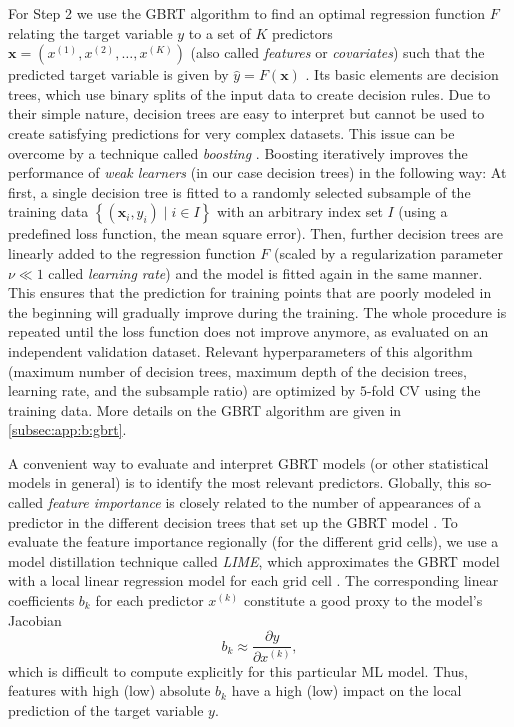 For Step 2 we use the \ac{GBRT} algorithm to find an optimal regression
function $F$ relating the target variable $y$ to a set of $K$ predictors
$\bm{x} = \left( x^{(1)}, x^{(2)}, \ldots, x^{(K)} \right)$ (also called
\emph{features} or \emph{covariates}) such that the predicted target variable
is given by $\hat{y} = F(\bm{x})$ \autocite{Death2007, Elith2008, Friedman2001,
  Friedman2002}. Its basic elements are decision trees, which use binary splits
of the input data to create decision rules. Due to their simple nature,
decision trees are easy to interpret but cannot be used to create satisfying
predictions for very complex datasets. This issue can be overcome by a
technique called \emph{boosting} \autocite{Freund1996}. Boosting iteratively
improves the performance of \emph{weak learners} (in our case decision trees)
in the following way: At first, a single decision tree is fitted to a randomly
selected subsample of the training data $\left\{ \left( \bm{x}_i, y_i \right)
\mid i \in I \right\}$ with an arbitrary index set $I$ (using a predefined loss
function, \eg{} the mean square error). Then, further decision trees are
linearly added to the regression function $F$ (scaled by a regularization
parameter $\nu \ll 1$ called \emph{learning rate}) and the model is fitted
again in the same manner. This ensures that the prediction for training points
that are poorly modeled in the beginning will gradually improve during the
training. The whole procedure is repeated until the loss function does not
improve anymore, as evaluated on an independent validation dataset. Relevant
hyperparameters of this algorithm (maximum number of decision trees, maximum
depth of the decision trees, learning rate, and the subsample ratio) are
optimized by $5$-fold \acf{CV} using the training data. More details on the
\ac{GBRT} algorithm are given in \cref{subsec:app:b:gbrt}.

A convenient way to evaluate and interpret \ac{GBRT} models (or other
statistical models in general) is to identify the most relevant predictors.
Globally, this so-called \emph{feature importance} is closely related to the
number of appearances of a predictor in the different decision trees that set
up the \ac{GBRT} model \autocite{Friedman2001}. To evaluate the feature
importance regionally (for the different grid cells), we use a model
distillation technique called \emph{\ac{LIME}}, which approximates the
\ac{GBRT} model with a local linear regression model for each grid cell
\autocite{Ribeiro2016}. The corresponding linear coefficients $b_k$ for each
predictor $x^{(k)}$ constitute a good proxy to the model's Jacobian
\begin{equation}
  b_k \approx \frac{\partial y}{\partial x^{(k)}},
  \label{eq:06:jacobian}
\end{equation}
which is difficult to compute explicitly for this particular \ac{ML} model.
Thus, features with high (low) absolute $b_k$ have a high (low) impact on the
local prediction of the target variable $y$.


